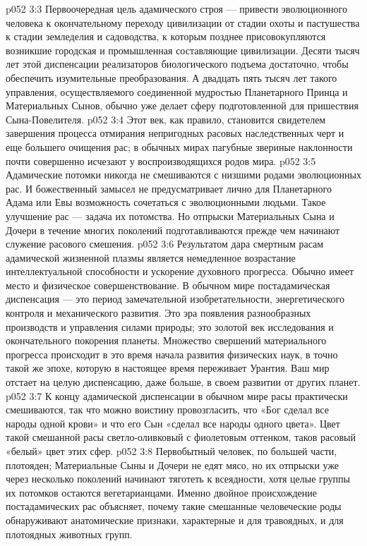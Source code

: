 \vs p052 3:3 \pc Первоочередная цель адамического строя --- привести эволюционного человека к окончательному переходу цивилизации от стадии охоты и пастушества к стадии земледелия и садоводства, к которым позднее присовокупляются возникшие городская и промышленная составляющие цивилизации. Десяти тысяч лет этой диспенсации реализаторов биологического подъема достаточно, чтобы обеспечить изумительные преобразования. А двадцать пять тысяч лет такого управления, осуществляемого соединенной мудростью Планетарного Принца и Материальных Сынов, обычно уже делает сферу подготовленной для пришествия Сына\hyp{}Повелителя.
\vs p052 3:4 \pc Этот век, как правило, становится свидетелем завершения процесса отмирания непригодных расовых наследственных черт и еще большего очищения рас; в обычных мирах пагубные звериные наклонности почти совершенно исчезают у воспроизводящихся родов мира.
\vs p052 3:5 Адамические потомки никогда не смешиваются с низшими родами эволюционных рас. И божественный замысел не предусматривает лично для Планетарного Адама или Евы возможность сочетаться с эволюционными людьми. Такое улучшение рас --- задача их потомства. Но отпрыски Материальных Сына и Дочери в течение многих поколений подготавливаются прежде чем начинают служение расового смешения.
\vs p052 3:6 Результатом дара смертным расам адамической жизненной плазмы является немедленное возрастание интеллектуальной способности и ускорение духовного прогресса. Обычно имеет место и физическое совершенствование. В обычном мире постадамическая диспенсация --- это период замечательной изобретательности, энергетического контроля и механического развития. Это эра появления разнообразных производств и управления силами природы; это золотой век исследования и окончательного покорения планеты. Множество свершений материального прогресса происходит в это время начала развития физических наук, в точно такой же эпохе, которую в настоящее время переживает Урантия. Ваш мир отстает на целую диспенсацию, даже больше, в своем развитии от других планет.
\vs p052 3:7 К концу адамической диспенсации в обычном мире расы практически смешиваются, так что можно воистину провозгласить, что «Бог сделал все народы одной крови» и что его Сын «сделал все народы одного цвета». Цвет такой смешанной расы светло\hyp{}оливковый с фиолетовым оттенком, таков расовый «белый» цвет этих сфер.
\vs p052 3:8 \pc Первобытный человек, по большей части, плотояден; Материальные Сыны и Дочери не едят мясо, но их отпрыски уже через несколько поколений начинают тяготеть к всеядности, хотя целые группы их потомков остаются вегетарианцами. Именно двойное происхождение постадамических рас объясняет, почему такие смешанные человеческие роды обнаруживают анатомические признаки, характерные и для травоядных, и для плотоядных животных групп.
